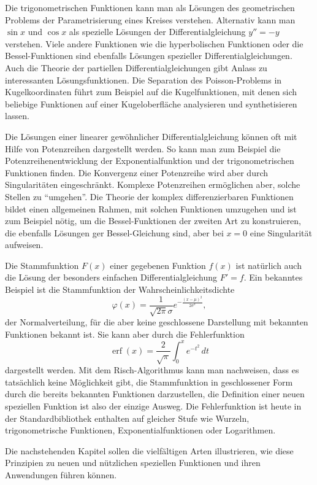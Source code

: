 Die trigonometrischen Funktionen kann man als Lösungen des geometrischen 
Problems der Parametrisierung eines Kreises verstehen.
Alternativ kann man $\sin x$ und $\cos x$ als spezielle Lösungen der
Differentialgleichung $y''=-y$ verstehen.
Viele andere Funktionen wie die hyperbolischen Funktionen oder die
Bessel-Funktionen sind ebenfalls Lösungen spezieller Differentialgleichungen.
Auch die Theorie der partiellen Differentialgleichungen gibt Anlass
zu interessanten Lösungsfunktionen.
Die Separation des Poisson-Problems in Kugelkoordinaten führt zum Beispiel
auf die Kugelfunktionen, mit denen sich beliebige Funktionen auf einer
Kugeloberfläche analysieren und synthetisieren lassen.

Die Lösungen einer linearer gewöhnlicher Differentialgleichung können
oft mit Hilfe von Potenzreihen dargestellt werden.
So kann man zum Beispiel die Potenzreihenentwicklung der Exponentialfunktion
und der trigonometrischen Funktionen finden.
Die Konvergenz einer Potenzreihe wird aber durch Singularitäten
eingeschränkt.
Komplexe Potenzreihen ermöglichen aber, solche Stellen zu ``umgehen''.
Die Theorie der komplex differenzierbaren Funktionen bildet einen
allgemeinen Rahmen, mit solchen Funktionen umzugehen und ist zum 
Beispiel nötig, um die Bessel-Funktionen der zweiten Art zu konstruieren,
die ebenfalls Lösungen ger Bessel-Gleichung sind, aber bei $x=0$
eine Singularität aufweisen.

Die Stammfunktion $F(x)$ einer gegebenen Funktion $f(x)$ ist natürlich
auch die Lösung der besonders einfachen Differentialgleichung $F'=f$.
Ein bekanntes Beispiel ist die Stammfunktion der Wahrscheinlichkeitsdichte
\[
\varphi(x)
=
\frac{1}{\sqrt{2\pi}\sigma} e^{-\frac{(x-\mu)^2}{2\sigma^2}},
\]
der Normalverteilung, für die aber keine geschlossene Darstellung
mit bekannten Funktionen bekannt ist.
Sie kann aber durch die Fehlerfunktion
\[
\operatorname{erf}(x)
=
\frac{2}{\sqrt{\pi}} \int_0^x e^{-t^2}\,dt
\]
dargestellt werden.
Mit dem Risch-Algorithmus kann man nachweisen, dass es tatsächlich
keine Möglichkeit gibt, die Stammfunktion in geschlossener Form durch
die bereits bekannten Funktionen darzustellen, die Definition einer
neuen speziellen Funktion ist also der einzige Ausweg.
Die Fehlerfunktion ist heute in der Standardbibliothek enthalten auf
gleicher Stufe wie Wurzeln, trigonometrische Funktionen,
Exponentialfunktionen oder Logarithmen.

Die nachstehenden Kapitel sollen die vielfältigen Arten illustrieren,
wie diese Prinzipien zu neuen und nützlichen speziellen Funktionen
und ihren Anwendungen führen können.



